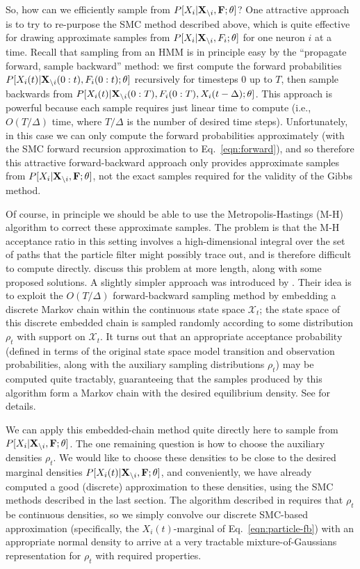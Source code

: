 \documentclass[aoas,preprint]{imsart}
\renewcommand{\i}{\backslash i}
\newcommand{\bth}{\mathbf{\theta}}
\newcommand{\bF}{{\bf F}}
\newcommand{\bX}{{\bf X}}
\begin{document}
So, how can we efficiently sample from $P[X_i | \bX_{\i}, \bF; \bth]$? One attractive approach is to try to re-purpose the SMC method described above, which is quite effective for drawing approximate samples from $P[X_i | \bX_{\i}, F_i; \bth]$ for one neuron $i$ at a time. Recall that sampling from an HMM is in principle easy by the ``propagate forward, sample backward'' method: we first compute the forward probabilities $P[X_i(t) | \bX_{\i}(0:t), F_i(0:t); \bth]$ recursively for timesteps $0$ up to $T$, then sample backwards from $P[X_i(t) | \bX_{\i}(0:T), F_i(0:T), X_i(t-\Delta); \bth]$. This approach is powerful because each sample requires just linear time to compute (i.e., $O(T/\Delta)$ time, where $T/\Delta$ is the number of desired time steps). Unfortunately, in this case we can only compute the forward probabilities approximately (with the SMC forward recursion approximation to Eq.~\eqref{eqn:forward}), and so therefore this attractive forward-backward approach only provides approximate samples from $P[X_i | \bX_{\i}, \bF; \bth]$, not the exact samples required for the validity of the Gibbs method.

Of course, in principle we should be able to use the Metropolis-Hastings (M-H) algorithm to correct these approximate samples. The problem is that the M-H acceptance ratio in this setting involves a high-dimensional integral over the set of paths that the particle filter might possibly trace out, and is therefore difficult to compute directly. \cite{Andrieu2007} discuss this problem at more length, along with some proposed solutions. A slightly simpler approach was introduced by \cite{NBR03}. Their idea is to exploit the $O(T/\Delta)$ forward-backward sampling method by embedding a discrete Markov chain within the continuous state space $\mathcal{X}_t$; the state space of this discrete embedded chain is sampled randomly according to some distribution $\rho_t$ with support on $\mathcal{X}_t$. It turns out that an appropriate acceptance probability (defined in terms of the original state space model transition and observation probabilities, along with the auxiliary sampling distributions $\rho_t$) may be computed quite tractably, guaranteeing that the samples produced by this algorithm form a Markov chain with the desired equilibrium density. See \cite{NBR03} for details.

We can apply this embedded-chain method quite directly here to sample from $P[X_i | \bX_{\i}, \bF; \bth]$. The one remaining question is how to choose the auxiliary densities $\rho_t$. We would like to choose these densities to be close to the desired marginal densities $P[X_i(t) | \bX_{\i}, \bF; \bth]$, and conveniently, we have already computed a good (discrete) approximation to these densities, using the SMC methods described in the last section. The algorithm described in \cite{NBR03} requires that $\rho_t$ be continuous densities, so we simply convolve our discrete SMC-based approximation (specifically, the $X_i(t)$-marginal of Eq.~\eqref{eqn:particle-fb}) with an appropriate normal density to arrive at a very tractable mixture-of-Gaussians representation for $\rho_t$ with required properties.
\end{document}
